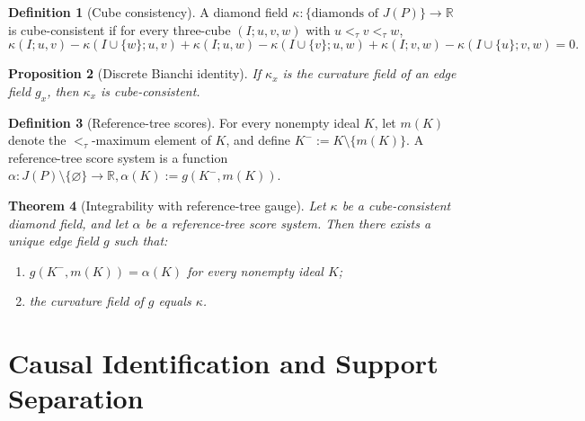 \documentclass{article}
\newtheorem{theorem}{Theorem}[section]
\newtheorem{proposition}[theorem]{Proposition}
\theoremstyle{definition}
\newtheorem{definition}[theorem]{Definition}
\newcommand{\RR}{\mathbb R}
\begin{document}
\begin{definition}[Cube consistency]
A diamond field
$
\kappa:\{\text{diamonds of }J(P)\}\to \RR
$
is {cube-consistent} if for every three-cube \((I;u,v,w)\) with \(u<_{\tau}v<_{\tau}w\),
\begin{equation}
\kappa(I;u,v)
-\kappa(I\cup\{w\};u,v)
+\kappa(I;u,w)
-\kappa(I\cup\{v\};u,w)
+\kappa(I;v,w)
-\kappa(I\cup\{u\};v,w)
=0.
\label{eq:cube-consistency}
\end{equation}
\end{definition}

\begin{proposition}[Discrete Bianchi identity]
\label{prop:bianchi-main}
If \(\kappa_x\) is the curvature field of an edge field \(g_x\), then \(\kappa_x\) is cube-consistent.
\end{proposition}

\begin{definition}[Reference-tree scores]
For every nonempty ideal \(K\), let \(m(K)\) denote the \(<_{\tau}\)-maximum element of \(K\), and define
$
K^-:=K\setminus\{m(K)\}
$.
A {reference-tree score system} is a function
$
\alpha:J(P)\setminus\{\varnothing\}\to \RR,
\alpha(K):=g(K^-,m(K)).
$
\end{definition}

\begin{theorem}[Integrability with reference-tree gauge]
\label{thm:integrability-main}
Let \(\kappa\) be a cube-consistent diamond field, and let \(\alpha\) be a reference-tree score system. Then there exists a unique edge field \(g\) such that:
\begin{enumerate}
    \item \(g(K^-,m(K))=\alpha(K)\) for every nonempty ideal \(K\);
    \item the curvature field of \(g\) equals \(\kappa\).
\end{enumerate}
\end{theorem}

\begin{center}
\end{center}

\section{Causal Identification and Support Separation}
\label{sec:causal}
\end{document}
